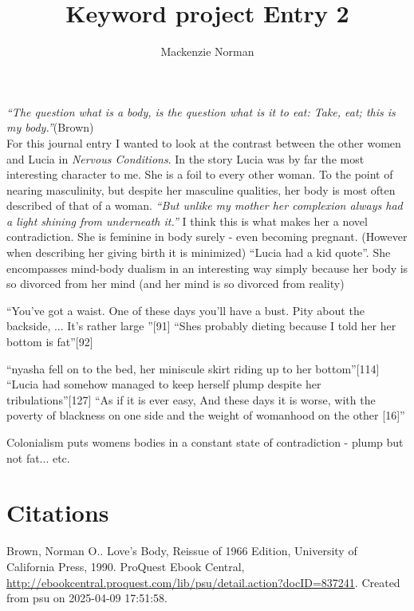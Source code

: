 \documentclass{article}
\title{Keyword project Entry 2}
\author{Mackenzie Norman}
\date{}
\begin{document}
\doublespacing 
\maketitle
\textit{``The question what is a body, is the question what is it to eat: Take, eat; this is my body.''}(Brown) \\


For this journal entry I wanted to look at the contrast between the other women and Lucia in \textit{Nervous Conditions}. In the story Lucia was by far the most interesting character to me. She is a foil to every other woman. To the point of nearing masculinity, but despite her masculine qualities, her body is most often described of that of a woman. \textit{``But unlike my mother her complexion always had a light shining from underneath it.'' } I think this is what makes her a novel contradiction. She is feminine in body surely - even becoming pregnant. (However when describing her giving birth it is minimized) ``Lucia had a kid quote''. She encompasses mind-body dualism in an interesting way simply because her body is so divorced from her mind (and her mind is so divorced from reality)

\pagebreak

``You've got a waist. One of these days you'll have a bust. Pity about the backside, ... It's rather large  ''[91]
``Shes probably dieting because I told her her bottom is fat''[92]

``nyasha fell on to the bed, her miniscule skirt riding up to her bottom''[114]
``Lucia had somehow managed to keep herself plump despite her tribulations''[127]
``As if it is ever easy, And these days it is worse, with the poverty of blackness on one side and the weight of womanhood on the other [16]''

Colonialism puts womens bodies in a constant state of contradiction  - plump but not fat... etc.
\paragraph{}

\section{Citations}

Brown, Norman O.. Love's Body, Reissue of 1966 Edition, University of California Press, 1990. ProQuest Ebook Central, \url{http://ebookcentral.proquest.com/lib/psu/detail.action?docID=837241}.
Created from psu on 2025-04-09 17:51:58. 
\end{document}
